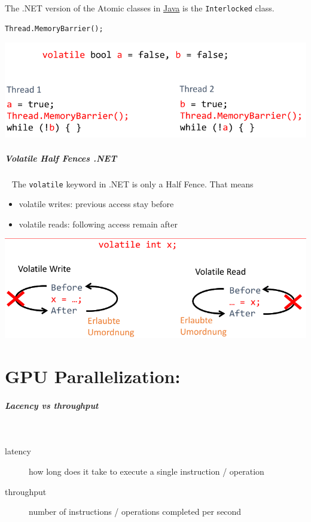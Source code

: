 \documentclass[11pt,twoside,landscape]{article}
\begin{document}
\begin{multicols}{3}
{{The .NET version of the Atomic classes in \href{../../../roam/20201116150053-java.org}{Java} is the \texttt{Interlocked} class.


\begin{lstlisting}
Thread.MemoryBarrier();
\end{lstlisting}


{
\begin{center}
\includegraphics[width=.9\linewidth]{img/rendez_vous_in_net.png}
\end{center}
\label{fig:rendez-vous-in-net}
}
\subparagraph{Volatile Half Fences .NET} \
\label{sec:org5e82248}
The \texttt{volatile} keyword in .NET is only a Half Fence.
That means
\begin{itemize}
\item volatile writes: previous access stay before
\item volatile reads: following access remain after
\end{itemize}

{
\begin{center}
\includegraphics[width=.9\linewidth]{img/net_volatile_half_fences.png}
\end{center}
\label{fig:net-volatile-half-fences}
}
\section{GPU Parallelization:}
\label{sec:org5a35fbe}
\subparagraph{Lacency vs throughput} \
\label{sec:orgc767db5}
\begin{description}
\item[{latency}] how long does it take to execute a single instruction / operation
\item[{throughput}] number of instructions / operations completed per second
\end{description}

}}
\end{multicols}
\end{document}
